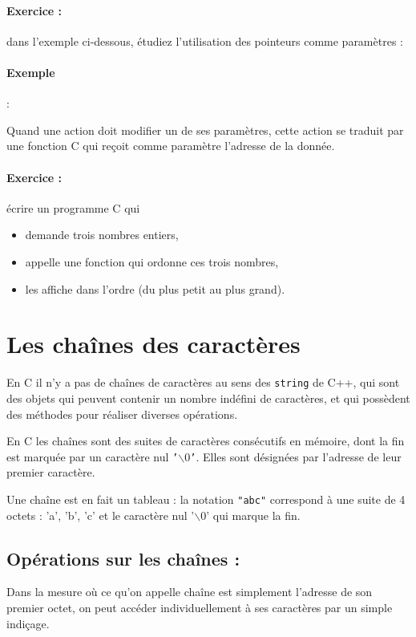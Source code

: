 \documentclass[10pt]{article}
\begin{document}
\paragraph{Exercice : } dans l'exemple ci-dessous, étudiez l'utilisation des pointeurs
comme paramètres : 
 \paragraph{Exemple} :
 

Quand une action doit modifier un de ses paramètres, cette action
se traduit par une fonction C qui reçoit comme paramètre l'adresse
de la donnée.

\paragraph{Exercice :} écrire un programme C qui 
\begin{itemize} 
\item demande trois nombres entiers,
\item appelle une fonction qui ordonne ces trois nombres,  
\item les affiche dans l'ordre (du plus petit au plus grand).
\end{itemize}

\section{Les chaînes des caractères}

En C il n'y a pas de chaînes de caractères au sens des \texttt{string} de C++,
qui sont des objets qui peuvent contenir un nombre indéfini de caractères,
et qui possèdent des méthodes pour réaliser diverses opérations.

En C les chaînes sont des suites de caractères  consécutifs en 
mémoire, dont la fin est marquée
par un caractère nul \texttt{'$\backslash 0$'}. 
Elles sont désignées par l'adresse
de leur premier caractère.

Une chaîne est en fait un tableau : la notation \texttt{"abc"}
 correspond à une suite de 4 octets : 'a', 'b', 'c' et le caractère
 nul '$\backslash 0$' qui marque la fin.


\subsection{Opérations sur les chaînes :} 

Dans la mesure où ce qu'on appelle chaîne est simplement l'adresse de
 son premier octet, on peut accéder individuellement à ses caractères
 par un simple indiçage.
\end{document}
